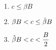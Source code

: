 \documentclass{jsarticle}
\begin{document}
\begin{enumerate}
\begin{enumerate}
\begin{enumerate}
 \item $c \leq \beta B$
 
 
 
 \item $\beta B < c \leq \Hat{\beta} B$
 
 
 
 \item $\Hat{\beta} B < c < \dfrac{B}{2}$
 
 
 
 \end{enumerate}

\end{enumerate}

\end{enumerate}
\end{document}

